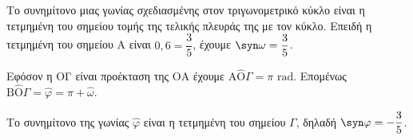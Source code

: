 \begin{alist}
\item Το συνημίτονο μιας γωνίας σχεδιασμένης στον τριγωνομετρικό κύκλο είναι η τετμημένη του σημείου τομής της τελικής πλευράς της με τον κύκλο. Επειδή η τετμημένη του σημείου A είναι $0,6 = \dfrac{3}{5}$, έχουμε $\syn \omega = \dfrac{3}{5}$.
\item
\begin{rlist}
\item Εφόσον η ΟΓ είναι προέκταση της ΟA έχουμε $\text{A}\hat{\text{O}}\Gamma = \pi \text{ rad}$. Επομένως $\text{B}\hat{\text{O}}\Gamma = \hat{\varphi} = \pi + \hat{\omega}$.
\item Το συνημίτονο της γωνίας $\hat{\varphi}$ είναι η τετμημένη του σημείου $\Gamma$, δηλαδή $\syn \varphi = -\dfrac{3}{5}$.
\end{rlist}
\end{alist}


